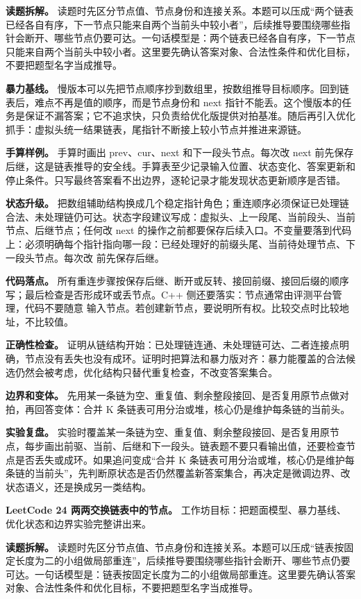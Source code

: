 \textbf{读题拆解。} 读题时先区分节点值、节点身份和连接关系。本题可以压成“两个链表已经各自有序，下一节点只能来自两个当前头中较小者”，后续推导要围绕哪些指针会断开、哪些节点仍要可达。一句话模型是：两个链表已经各自有序，下一节点只能来自两个当前头中较小者。这里要先确认答案对象、合法性条件和优化目标，不要把题型名字当成推导。

\textbf{暴力基线。} 慢版本可以先把节点顺序抄到数组里，按数组推导目标顺序。回到链表后，难点不再是值的顺序，而是节点身份和 next 指针不能丢。这个慢版本的任务是保证不漏答案；它不追求快，只负责给优化版提供对拍基准。随后再引入优化抓手：虚拟头统一结果链表，尾指针不断接上较小节点并推进来源链。

\textbf{手算样例。} 手算时画出 prev、cur、next 和下一段头节点。每次改 next 前先保存后继，这是链表推导的安全线。手算表至少记录输入位置、状态变化、答案更新和停止条件。只写最终答案看不出边界，逐轮记录才能发现状态更新顺序是否错。

\textbf{状态升级。} 把数组辅助结构换成几个稳定指针角色；重连顺序必须保证已处理链合法、未处理链仍可达。状态字段建议写成：虚拟头、上一段尾、当前段头、当前节点、后继节点；任何改 next 的操作之前都要保存后续入口。不变量要落到代码上：必须明确每个指针指向哪一段：已经处理好的前缀头尾、当前待处理节点、下一段头节点。每次改  前先保存后继。

\textbf{代码落点。} 所有重连步骤按保存后继、断开或反转、接回前缀、接回后缀的顺序写；最后检查是否形成环或丢节点。C++ 侧还要落实：节点通常由评测平台管理，代码不要随意  输入节点。若创建新节点，要说明所有权。比较交点时比较地址，不比较值。

\textbf{正确性检查。} 证明从链结构开始：已处理链连通、未处理链可达、二者连接点明确，节点没有丢失也没有成环。证明时把算法和暴力版对齐：暴力能覆盖的合法候选仍然会被考虑，优化结构只替代重复检查，不改变答案集合。

\textbf{边界和变体。} 先用某一条链为空、重复值、剩余整段接回、是否复用原节点做对拍，再回答变体：合并 K 条链表可用分治或堆，核心仍是维护每条链的当前头。

\textbf{实验复盘。} 实验时覆盖某一条链为空、重复值、剩余整段接回、是否复用原节点，每步画出前驱、当前、后继和下一段头。链表题不要只看输出值，还要检查节点是否丢失或成环。如果追问变成“合并 K 条链表可用分治或堆，核心仍是维护每条链的当前头”，先判断原状态是否仍然覆盖新答案集合，再决定是微调边界、改状态语义，还是换成另一类结构。

\noindent\textbf{LeetCode 24 两两交换链表中的节点。} 工作坊目标：把题面模型、暴力基线、优化状态和边界实验完整讲出来。

\textbf{读题拆解。} 读题时先区分节点值、节点身份和连接关系。本题可以压成“链表按固定长度为二的小组做局部重连”，后续推导要围绕哪些指针会断开、哪些节点仍要可达。一句话模型是：链表按固定长度为二的小组做局部重连。这里要先确认答案对象、合法性条件和优化目标，不要把题型名字当成推导。

